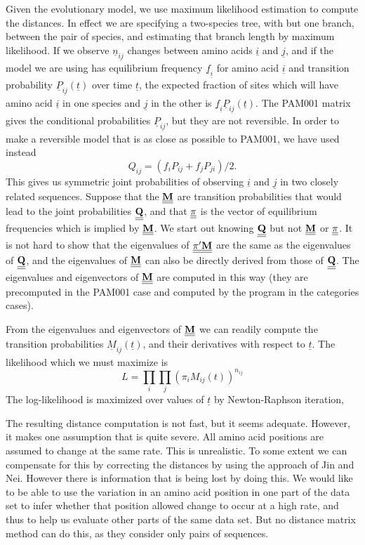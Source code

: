 \documentclass[12pt]{article}
\def\ul{\underline}
\begin{document}
Given the evolutionary model, we use maximum likelihood estimation to
compute the distances.  In effect we are specifying a two-species tree, with
but one branch, between the pair of species, and estimating that branch length
by maximum likelihood.  If we observe $\ul{n}_{\ul{ij}}$ changes between amino acids
$\ul{i}$ and $\ul{j}$, and if the model we are using has equilibrium frequency $\ul{f}_{\ul{i}}$ for
amino acid $\ul{i}$ and transition probability $\ul{P}_{\ul{ij}}(\ul{t})$ over time $\ul{t}$,
the expected fraction of sites which will have amino acid $\ul{i}$ in one species
and $\ul{j}$ in the other is $\ul{f}_{\ul{i}} \ul{P}_{\ul{ij}}(\ul{t})$.  The PAM001 matrix gives the
conditional probabilities $\ul{P}_{\ul{ij}}$, but they are not reversible.  In order to
make a reversible model that is as close as possible to PAM001, we have
used instead
\begin{equation}
Q_{ij} = \left(f_i P_{ij} + f_j P_{ji}\right)/2.
\end{equation}
This gives us symmetric joint probabilities of observing $\ul{i}$ and $\ul{j}$ in two closely
related sequences.  Suppose that the $\bf \ul{\ul{M}}$ are transition probabilities
that would lead to the joint probabilities $\bf \ul{\ul{Q}}$, and that $\bf \ul{\ul{\pi}}$ is the
vector of equilibrium frequencies which is implied by $\bf \ul{\ul{M}}$.  We start out
knowing $\bf \ul{\ul{Q}}$ but not $\bf \ul{\ul{M}}$ or $\bf \ul{\ul{\pi}}$.  It is not hard to show that the eigenvalues of $\bf \ul{\ul{\pi'}} \ul{\ul{M}}$
are the same as the eigenvalues of $\bf \ul{\ul{Q}}$, and the eigenvalues of ${\bf \ul{\ul{M}}}$
can also be directly derived from those of ${\bf \ul{\ul{Q}}}$.   The eigenvalues and
eigenvectors of ${\bf \ul{\ul{M}}}$ are computed in this way (they are precomputed in the PAM001
case and computed by the program in the categories cases). 

From the eigenvalues and eigenvectors of ${\bf \ul{\ul{M}}}$ we can readily compute the
transition probabilities $\ul{M}_{\ul{ij}}(\ul{t})$, and their derivatives with respect
to $\ul{t}$.  The likelihood which we must maximize is
\begin{equation}
L = \prod_i \prod_j  \left( \pi_i M_{ij}(t) \right)^{n_{ij}}
\end{equation}
\noindent
The log-likelihood is maximized over values of $\ul{t}$ by Newton-Raphson iteration,

The resulting distance computation is not fast, but it seems adequate.  However,
it makes one assumption that is quite severe.  All amino acid positions are
assumed to change at the same rate.  This is unrealistic.  To some extent we
can compensate for this by correcting the distances by using the approach
of Jin and Nei\footnotemark[20].  However there is information that is being lost by
doing this.  We would like to be able to use the variation in an amino acid
position in one part of the data set to infer whether that position allowed
change to occur at a high rate, and thus to help us evaluate other parts of
the same data set.  But no distance matrix method can do this, as they consider
only pairs of sequences.
\end{document}
